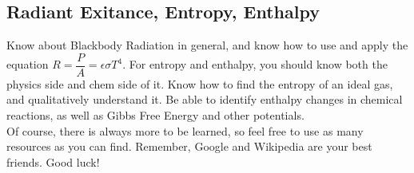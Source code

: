 \documentclass[twocolumn]{article}
\begin{document}
\subsection{Radiant Exitance, Entropy, Enthalpy}
Know about Blackbody Radiation in general, and know how to use and apply the equation $R=\dfrac{P}{A}=\epsilon\sigma T^4$. For entropy and enthalpy, you should know both the physics side and chem side of it. Know how to find the entropy of an ideal gas, and qualitatively understand it. Be able to identify enthalpy changes in chemical reactions, as well as Gibbs Free Energy and other potentials. \\

Of course, there is always more to be learned, so feel free to use as many resources as you can find. Remember, Google and Wikipedia are your best friends. Good luck!
\end{document}
